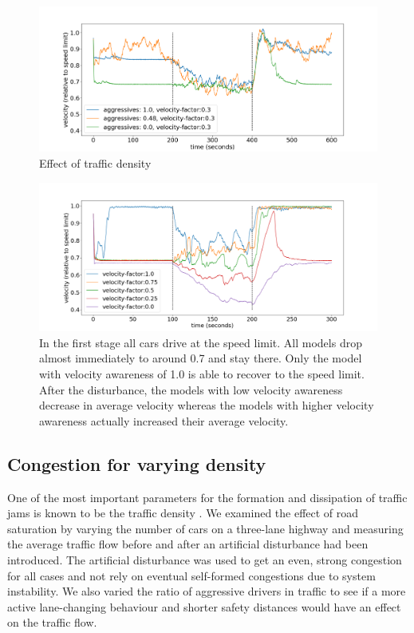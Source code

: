 \documentclass[11pt,a4paper,twocolumn]{article}
\begin{document}
\begin{figure}[t]     
      \centering
       \includegraphics[scale=0.35]{figs/velocity_over_time_aggressive.png}
       \caption{Effect of traffic density }
       \label{fig:vel_agg_over_time}
 \end{figure}
 
\begin{figure}[t]
    \centering
      \includegraphics[scale=0.35, trim={0 0 0 0 }]{figs/velocity_over_time.png}
      \caption{In the first stage all cars drive at the speed limit. All models drop almost immediately to around 0.7 and stay there. Only the model with velocity awareness of 1.0 is able to recover to the speed limit. After the disturbance, the models with low velocity awareness decrease in average velocity whereas the models with higher velocity awareness actually increased their average velocity.}
      \label{fig:vel_over_time}
\end{figure}
 
 \subsection{Congestion for varying density}
 One of the most important parameters for the formation and dissipation of traffic jams is known to be the traffic density \cite{kerner96trafficjam, kerner97flow}. We examined the effect of road saturation by varying the number of cars on a three-lane highway and measuring the average traffic flow  before and after an artificial disturbance had been introduced. The artificial disturbance was used to get an even, strong congestion for all cases and not rely on eventual self-formed congestions due to system instability.  We also varied the ratio of aggressive drivers in traffic to see if a more active lane-changing behaviour and shorter safety distances would have an effect on the traffic flow.
 
\end{document}
